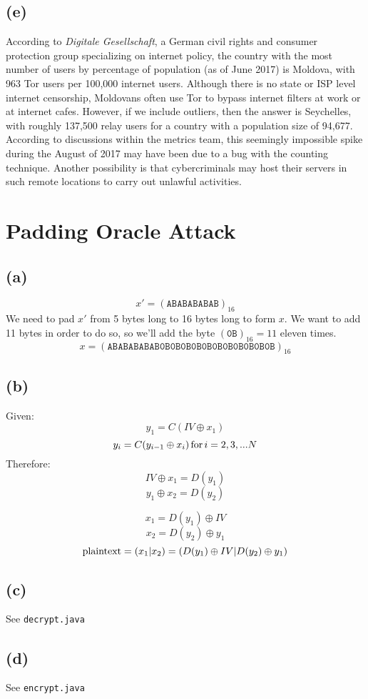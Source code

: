 \documentclass{article}
\begin{document}
\subsection*{(e)}
According to \textit{Digitale Gesellschaft}, a German civil rights and consumer protection group specializing on internet policy, the country with the most number of users by percentage of population (as of June 2017) is Moldova, with 963 Tor users per 100,000 internet users. Although there is no state or ISP level internet censorship, Moldovans often use Tor to bypass internet filters at work or at internet cafes. However, if we include outliers, then the answer is Seychelles, with roughly 137,500 relay users for a country with a population size of 94,677. According to discussions within the metrics team, this seemingly impossible spike during the August of 2017 may have been due to a bug with the counting technique. Another possibility is that cybercriminals may host their servers in such remote locations to carry out unlawful activities. 


\section*{Padding Oracle Attack}
\subsection*{(a)}
$$x'=(\texttt{ABABABABAB})_{16}$$
We need to pad $x'$ from 5 bytes long to 16 bytes long to form $x$. We want to add 11 bytes in order to do so, so we'll add the byte $(\texttt{0B})_{16}=11$ eleven times.
$$x=(\texttt{ABABABABAB0B0B0B0B0B0B0B0B0B0B0B})_{16}$$
\subsection*{(b)}
Given:
$$y_1=C(IV\oplus x_1)$$
$$y_i=C(y_{i-1}\oplus x_i) \thinspace \textnormal{for}\thinspace i=2, 3, ...N$$
Therefore:
$$IV \oplus x_1 = D(y_1) $$
$$y_1 \oplus x_2 = D(y_2) $$

$$x_1 = D(y_1) \oplus IV $$
$$x_2 = D(y_2) \oplus y_1 $$
$$\textnormal{plaintext}=(x_1|x_2)=(D(y_1)\oplus IV|D(y_2)\oplus y_1)$$

\subsection*{(c)}
See \texttt{decrypt.java}

\subsection*{(d)}
See \texttt{encrypt.java}
\end{document}
